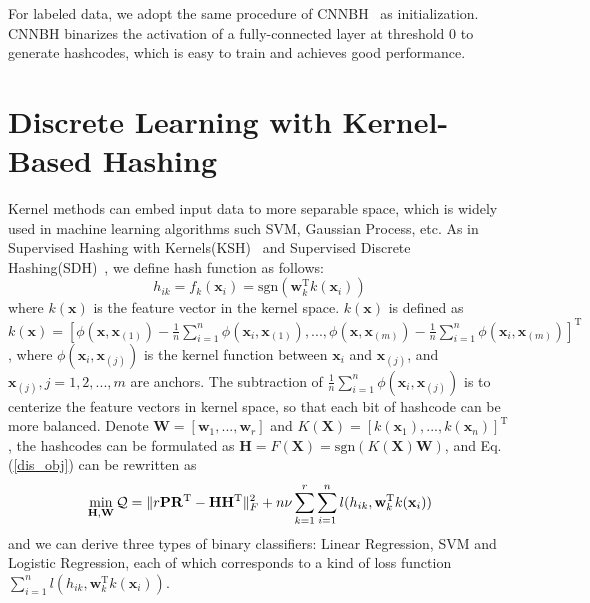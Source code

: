 \documentclass[conference]{IEEEtran}
\begin{document}
For labeled data, we adopt the same procedure of CNNBH~\cite{guo2016hash} as initialization. CNNBH binarizes the activation of a fully-connected layer at threshold 0 to generate hashcodes, which is easy to train and achieves good performance.

\section{Discrete Learning with Kernel-Based Hashing}
\label{sec:kernelhash}

Kernel methods can embed input data to more separable space, which is widely used in machine learning algorithms such SVM, Gaussian Process, etc. As in Supervised Hashing with Kernels(KSH)~\cite{liu2012supervised} and Supervised Discrete Hashing(SDH)~\cite{Shen_2015_CVPR}, we define hash function as follows:
\begin{equation}
h_{ik}=f_k(\mathbf{x}_i)=\mathrm{sgn}(\mathbf{w}_k^\mathrm{T} k(\mathbf{x}_i))
\label{equ:kernelf}
\end{equation}
where $k(\mathbf{x})$ is the feature vector in the kernel space. $k(\mathbf{x})$ is defined as $k(\mathbf{x}) = [\phi(\mathbf{x}, \mathbf{x}_{(1)}) - \frac{1}{n} \sum_{i=1}^n  \phi(\mathbf{x}_i, \mathbf{x}_{(1)}), ..., \phi(\mathbf{x}, \mathbf{x}_{(m)}) - \frac{1}{n} \sum_{i=1}^n \phi(\mathbf{x}_i, \mathbf{x}_{(m)})]^\mathrm{T}$, where $\phi(\mathbf{x}_i, \mathbf{x}_{(j)})$ is the kernel function between $\mathbf{x}_i$ and $\mathbf{x}_{(j)}$, and $\mathbf{x}_{(j)}, j = 1,2,...,m$ are anchors. The subtraction of $\frac{1}{n} \sum_{i=1}^n \phi(\mathbf{x}_i, \mathbf{x}_{(j)})$ is to centerize the feature vectors in kernel space, so that each bit of hashcode can be more balanced. Denote $\mathbf{W}=[\mathbf{w}_1,...,\mathbf{w}_r]$ and $K(\mathbf{X})=[k(\mathbf{x}_1),...,k(\mathbf{x}_n)]^\mathrm{T}$, the hashcodes can be formulated as  $\mathbf{H} = F(\mathbf{X}) = \mathrm{sgn}(K(\mathbf{X})\mathbf{W})$, and Eq. (\ref{dis_obj}) can be rewritten as
\begin{equation}
\min_{\mathbf{H}, \mathbf{W}} \mathcal{Q} = \Arrowvert r\mathbf{P}\mathbf{R}^\mathrm{T}- \mathbf{H} \mathbf{H}^\mathrm{T} \Arrowvert_F^2 + n \nu \sum_{k=1}^r \sum_{i=1}^n l (h_{ik}, \mathbf{w}_k^\mathrm{T} k(\mathbf{x}_i))
\label{ksh_dis_obj}
\end{equation}
and we can derive three types of binary classifiers: Linear Regression, SVM and Logistic Regression, each of which corresponds to a kind of loss function $\sum_{i=1}^n l (h_{ik}, \mathbf{w}_k^\mathrm{T} k(\mathbf{x}_i))$.
\end{document}
